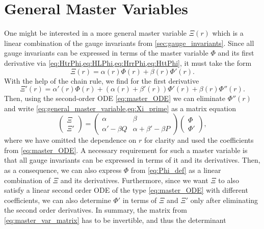 \documentclass[11pt,aip,jmp,amsmath,amssymb,draft]{revtex4-1}
\begin{document}
\section{\label{sec:appendix_master_var}General Master Variables}
One might be interested in a more general master variable $\Xi(r)$ which is a linear combination of the gauge invariants from \cref{sec:gauge_invariants}.
Since all gauge invariants can be expressed in terms of the master variable $\Phi$ and its first derivative via \cref{eq:HtrPhi,eq:HLPhi,eq:HrrPhi,eq:HttPhi}, it must take the form 
\begin{equation} \label{eq:general_master_variable}
    \Xi(r) = \alpha(r)\Phi(r) + \beta(r)\Phi'(r).
\end{equation}
With the help of the chain rule, we find for the first derivative
\begin{equation} \label{eq:Xi_prime}
    \Xi'(r) = \alpha'(r)\Phi(r) + (\alpha(r) + \beta'(r))\Phi'(r)+ \beta(r)\Phi''(r).
\end{equation} 
Then, using the second-order ODE \cref{eq:master_ODE} we can eliminate $\Phi''(r)$ and write \cref{eq:general_master_variable,eq:Xi_prime} as a matrix equation
\begin{equation} \label{eq:master_var_matrix}
    \begin{pmatrix}
        \Xi \\ \Xi'
    \end{pmatrix} = 
    \begin{pmatrix}
        \alpha & \beta \\ 
        \alpha' - \beta Q & \alpha + \beta' - \beta P
    \end{pmatrix}
    \begin{pmatrix}
        \Phi \\ \Phi'
    \end{pmatrix},
\end{equation}
where we have omitted the dependence on $r$ for clarity and used the coefficients from \cref{eq:master_ODE}. 
A necessary requirement for such a master variable is that all gauge invariants can be expressed in terms of it and its derivatives. 
Then, as a consequence, we can also express $\Phi$ from \cref{eq:Phi_def} as a linear combination of $\Xi$ and its derivatives. Furthermore, since we want $\Xi$ to also satisfy a linear second order ODE of the type \cref{eq:master_ODE} with different coefficients, we can also determine $\Phi'$ in terms of $\Xi$ and $\Xi'$ only after eliminating the second order derivatives.
In summary, the matrix from \cref{eq:master_var_matrix} has to be invertible, and thus the determinant
\end{document}
